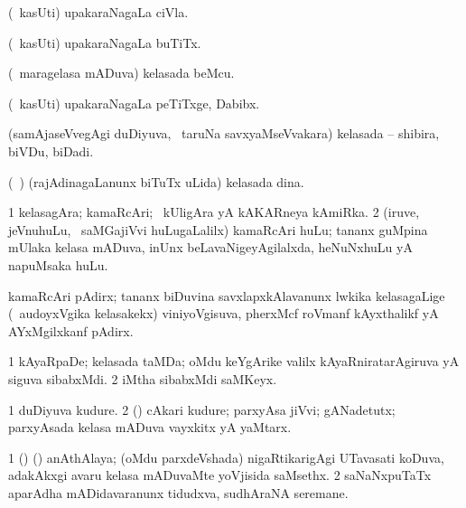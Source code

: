 \bentry
{} 
\gl{\nA}
\expl{}
\bmng
(\kanmu\ kasUti) upakaraNagaLa ciVla. 
\emng
\eentry

\bentry 
{} 
\gl{\nA}
\expl{}
\bmng
(\kanmu\ kasUti) upakaraNagaLa buTiTx. 
\emng
\eentry

\bentry
{} 
\gl{\nA}
\expl{}
\bmng
(\kanmu\ maragelasa mADuva) kelasada beMcu. 
\emng
\eentry

\bentry
{} 
\gl{\nA}
\expl{}
\bmng
(\kanmu\ kasUti) upakaraNagaLa peTiTxge, Dabibx. 
\emng
\eentry

\bentry
{} 
\gl{\nA}
\expl{}
\bmng
(samAjaseVvegAgi duDiyuva, \kanmu\ taruNa savxyaMseVvakara) kelasada -- shibira, biVDu, biDadi. 
\emng
\eentry

\bentry
{} 
\gl{\nA}
\expl{}
\bmng
(\kanmu\ \ame) (rajAdinagaLanunx biTuTx uLida) kelasada dina. 
\emng
\eentry

\bentry
{} 
\gl{\nA}
\expl{}
\bmng
\bnum
\num{1} kelasagAra; kamaRcAri; \kanmu\ kUligAra yA kAKARneya kAmiRka. 
\num{2} (iruve, jeVnuhuLu, \mo\ saMGajiVvi huLugaLalilx) kamaRcAri huLu; tananx guMpina mUlaka kelasa mADuva, inUnx beLavaNigeyAgilalxda, heNuNxhuLu yA napuMsaka huLu. 
\enum
\emng
\eentry

\bentry 
{} 
\gl{\nA}
\expl{}
\bmng
kamaRcAri pAdirx; tananx biDuvina savxlapxkAlavanunx lwkika kelasagaLige (\kanmu\ audoyxVgika kelasakekx) viniyoVgisuva, pherxMcf roVmanf kAyxthalikf yA AYxMgilxkanf pAdirx. 
\emng
\eentry

\bentry
{} 
\gl{\nA}
\expl{}
\bmng
\bnum
\num{1} kAyaRpaDe; kelasada taMDa; oMdu keYgArike \mo valilx kAyaRniratarAgiruva yA siguva sibabxMdi. 
\num{2} iMtha sibabxMdi saMKeyx. 
\enum
\emng
\eentry

\bentry
{} 
\gl{\nA}
\expl{}
\bmng
\bnum
\num{1} duDiyuva kudure. 
\num{2} (\rUpa) cAkari kudure; parxyAsa jiVvi; gANadetutx; parxyAsada kelasa mADuva vayxkitx yA yaMtarx. 
\enum
\emng
\eentry

\bentry
{} 
\gl{\nA}
\expl{}
\bmng
% 
\bnum
\num{1} (\birx) (\ca) anAthAlaya; (oMdu parxdeVshada) nigaRtikarigAgi UTavasati koDuva, adakAkxgi avaru kelasa mADuvaMte yoVjisida saMsethx. 
\num{2} saNaNxpuTaTx aparAdha mADidavaranunx tidudxva, sudhAraNA seremane. 
\enum
\emng
\eentry

